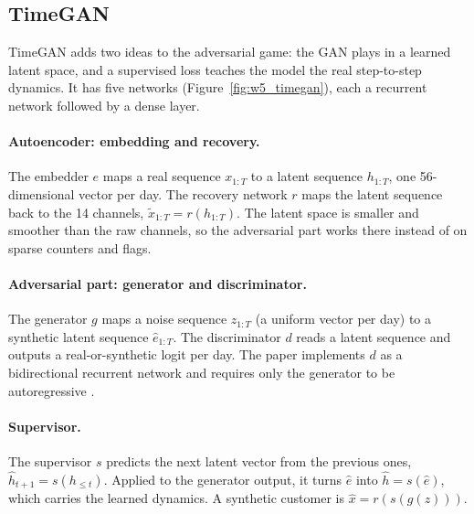 \documentclass{article}
\begin{document}
\subsection{TimeGAN}
\label{sec:w5_timegan}

TimeGAN \cite{yoon2019} adds two ideas to the adversarial game: the GAN plays in a learned latent space, and a supervised loss teaches the model the real step-to-step dynamics. It has five networks (Figure~\ref{fig:w5_timegan}), each a recurrent network followed by a dense layer.

\paragraph{Autoencoder: embedding and recovery.} The embedder $e$ maps a real sequence $x_{1:T}$ to a latent sequence $h_{1:T}$, one 56-dimensional vector per day. The recovery network $r$ maps the latent sequence back to the 14 channels, $\tilde{x}_{1:T} = r(h_{1:T})$. The latent space is smaller and smoother than the raw channels, so the adversarial part works there instead of on sparse counters and flags.

\paragraph{Adversarial part: generator and discriminator.} The generator $g$ maps a noise sequence $z_{1:T}$ (a uniform vector per day) to a synthetic latent sequence $\hat{e}_{1:T}$. The discriminator $d$ reads a latent sequence and outputs a real-or-synthetic logit per day. The paper implements $d$ as a bidirectional recurrent network and requires only the generator to be autoregressive \cite{yoon2019}.

\paragraph{Supervisor.} The supervisor $s$ predicts the next latent vector from the previous ones, $\hat{h}_{t+1} = s(h_{\le t})$. Applied to the generator output, it turns $\hat{e}$ into $\hat{h} = s(\hat{e})$, which carries the learned dynamics. A synthetic customer is $\hat{x} = r(s(g(z)))$.
\end{document}
